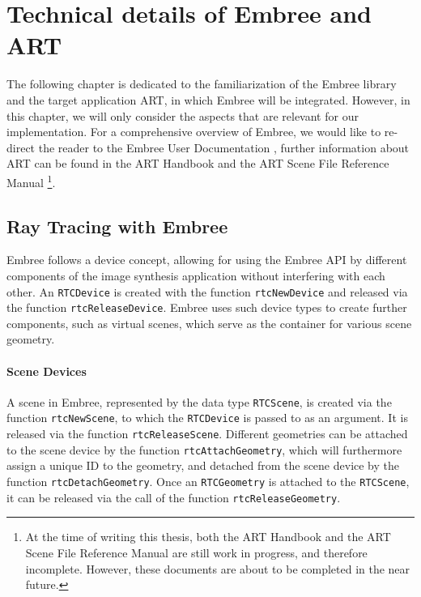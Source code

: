 \chapter{Technical details of Embree and ART}
\label{chap:technical_overview}

The following chapter is dedicated to the familiarization of the Embree library and the target application ART, in which Embree will be integrated. However, in this chapter, we will only consider the aspects that are relevant for our implementation. For a comprehensive overview of Embree, we would like to re-direct the reader to the Embree User Documentation \cite{embree2021Doc}, further information about ART can be found in the ART Handbook \cite{arthandbook} and the ART Scene File Reference Manual \cite{artreferencemanual} \footnote{At the time of writing this thesis, both the ART Handbook and the ART Scene File Reference Manual are still work in progress, and therefore incomplete. However, these documents are about to be completed in the near future.}.

\section{Ray Tracing with Embree}
\label{sec:embree_raytracing}

Embree follows a device concept, allowing for using the Embree API by different components of the image synthesis application without interfering with each other. An \texttt{RTCDevice} is created with the function \texttt{rtcNewDevice} and released via the function \texttt{rtcReleaseDevice}. Embree uses such device types to create further components, such as virtual scenes, which serve as the container for various scene geometry. 

\subsubsection{Scene Devices}

A scene in Embree, represented by the data type \texttt{RTCScene}, is created via the function \texttt{rtcNewScene}, to which the \texttt{RTCDevice} is passed to as an argument. It is released via the function \texttt{rtcReleaseScene}. Different geometries can be attached to the scene device by the function \texttt{rtcAttachGeometry}, which will furthermore assign a unique ID to the geometry, and detached from the scene device by the function \texttt{rtcDetachGeometry}. Once an \texttt{RTCGeometry} is attached to the \texttt{RTCScene}, it can be released via the call of the function \texttt{rtcReleaseGeometry}.


